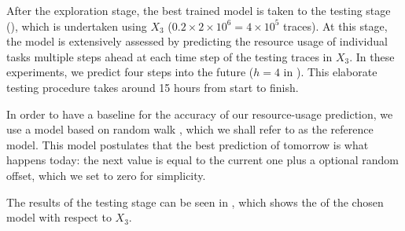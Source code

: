 After the exploration stage, the best trained model is taken to the testing
stage (), which is undertaken using $X_3$ ($0.2 \times 2 \times
10^6 = 4 \times 10^5$ traces). At this stage, the model is extensively assessed
by predicting the resource usage of individual tasks multiple steps ahead at
each time step of the testing traces in $X_3$. In these experiments, we predict
four steps into the future ($h = 4$ in ). This elaborate testing
procedure takes around 15 hours from start to finish.

In order to have a baseline for the accuracy of our resource-usage prediction,
we use a model based on random walk \cite{hastie2009}, which we shall refer to
as the reference model. This model postulates that the best prediction of
tomorrow is what happens today: the next value is equal to the current one plus
a optional random offset, which we set to zero for simplicity.

The results of the testing stage can be seen in , which shows the
 of the chosen model with respect to $X_3$.
